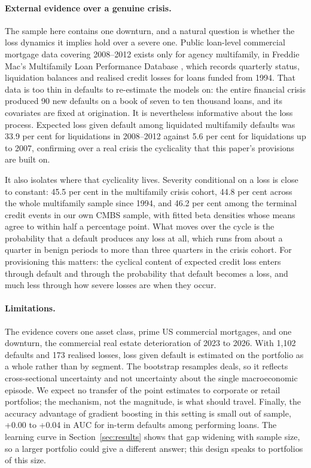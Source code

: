 \documentclass[11pt]{article}
\begin{document}
\paragraph{External evidence over a genuine crisis.} The sample here contains one downturn, and a natural question
is whether the loss dynamics it implies hold over a severe one. Public loan-level commercial mortgage data covering
2008--2012 exists only for agency multifamily, in Freddie Mac's Multifamily Loan Performance Database \citep{freddie_mlpd}, which
records quarterly status, liquidation balances and realised credit losses for loans funded from 1994. That data is
too thin in defaults to re-estimate the models on: the entire financial crisis produced 90 new defaults on a book
of seven to ten thousand loans, and its covariates are fixed at origination. It is nevertheless informative about
the loss process. Expected loss given default among liquidated multifamily defaults was 33.9 per cent for
liquidations in 2008--2012 against 5.6 per cent for liquidations up to 2007, confirming over a real crisis the
cyclicality that this paper's provisions are built on.

It also isolates where that cyclicality lives. Severity conditional on a loss is close to constant: 45.5 per cent
in the multifamily crisis cohort, 44.8 per cent across the whole multifamily sample since 1994, and 46.2 per cent
among the terminal credit events in our own CMBS sample, with fitted beta densities whose means agree to within
half a percentage point. What moves over the cycle is the probability that a default produces any loss at all,
which runs from about a quarter in benign periods to more than three quarters in the crisis cohort. For
provisioning this matters: the cyclical content of expected credit loss enters through default and through the
probability that default becomes a loss, and much less through how severe losses are when they occur.

\paragraph{Limitations.} The evidence covers one asset class, prime US commercial mortgages, and one downturn, the
commercial real estate deterioration of 2023 to 2026. With 1{,}102 defaults and 173 realised losses, loss given
default is estimated on the portfolio as a whole rather than by segment. The bootstrap resamples deals, so it
reflects cross-sectional uncertainty and not uncertainty about the single macroeconomic episode. We expect no
transfer of the point estimates to corporate or retail portfolios; the mechanism, not the magnitude, is what
should travel. Finally, the accuracy advantage of gradient boosting in this setting is small out of sample, +0.00
to +0.04 in AUC for in-term defaults among performing loans. The learning curve in Section~\ref{sec:results}
shows that gap widening with sample size, so a larger portfolio could give a different answer; this design speaks
to portfolios of this size.
\end{document}

